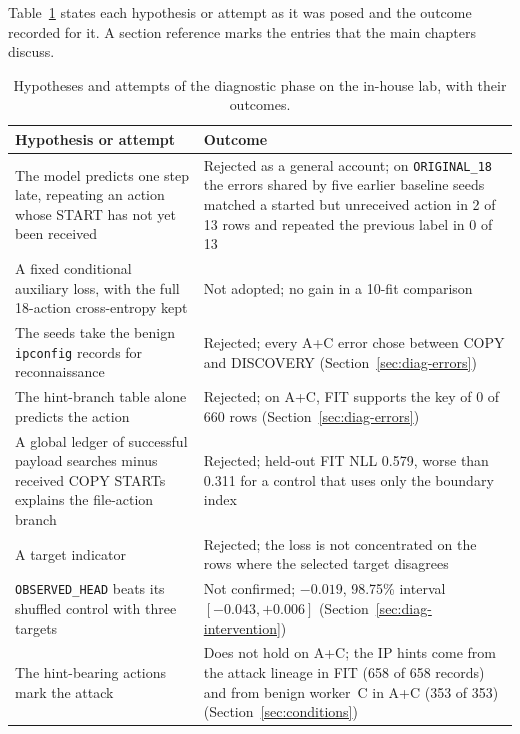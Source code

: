 Table~\ref{tab:rej-hypotheses} states each hypothesis or attempt as it
was posed and the outcome recorded for it. A section reference marks
the entries that the main chapters discuss.

\begin{table}[htbp]
\centering
\small
\caption[Hypotheses and attempts of the diagnostic phase]{Hypotheses and attempts of the diagnostic phase on the in-house
lab, with their outcomes.}
\label{tab:rej-hypotheses}
\begin{tabularx}{\textwidth}{@{}>{\raggedright\arraybackslash}X>{\raggedright\arraybackslash}X@{}}
\toprule
Hypothesis or attempt & Outcome \\
\midrule
The model predicts one step late, repeating an action whose START has
not yet been received
    & Rejected as a general account; on \texttt{ORIGINAL\_18} the errors
    shared by five earlier baseline seeds matched a started but
    unreceived action in 2 of 13 rows and repeated the previous label in
    0 of 13 \\
A fixed conditional auxiliary loss, with the full 18-action
cross-entropy kept
  & Not adopted; no gain in a 10-fit comparison \\
The seeds take the benign \texttt{ipconfig} records for reconnaissance
  & Rejected; every A+C error chose between COPY and DISCOVERY
    (Section~\ref{sec:diag-errors}) \\
The hint-branch table alone predicts the action
  & Rejected; on A+C, FIT supports the key of 0 of 660 rows
    (Section~\ref{sec:diag-errors}) \\
A global ledger of successful payload searches minus received COPY
STARTs explains the file-action branch
  & Rejected; held-out FIT NLL 0.579, worse than 0.311 for a control
    that uses only the boundary index \\
A target indicator
  & Rejected; the loss is not concentrated on the rows where the
    selected target disagrees \\
\texttt{OBSERVED\_HEAD} beats its shuffled control with three targets
  & Not confirmed; $-0.019$, 98.75\% interval $[-0.043, +0.006]$
    (Section~\ref{sec:diag-intervention}) \\
The hint-bearing actions mark the attack
  & Does not hold on A+C; the IP hints come from the attack lineage in FIT
    (658 of 658 records) and from benign worker~C in A+C (353 of 353)
    (Section~\ref{sec:conditions}) \\

\end{tabularx}
\end{table}

